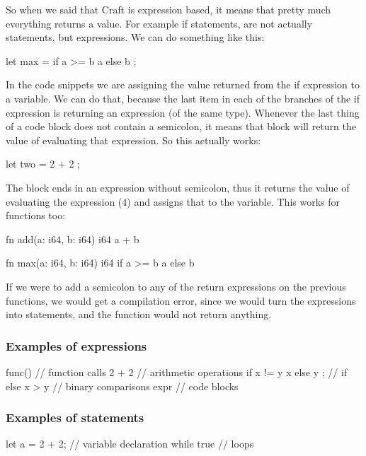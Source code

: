 ﻿\documentclass[10pt,a4paper,twocolumn,twoside]{article}
\begin{document}
So when we said that Craft is expression based, it means that pretty much
everything returns a value. For example if statements, are not actually
statements, but expressions. We can do something like this:

\begin{code}
    let max = if a >= b { a } else { b };
\end{code}

In the code snippets we are assigning the value returned from the if expression
to a variable. We can do that, because the last item in each of the branches of
the if expression is returning an expression (of the same type). Whenever the
last thing of a code block does not contain a semicolon, it means that block
will return the value of evaluating that expression. So this actually works: 

\begin{code}
    let two = {
        2 + 2
    };
\end{code}

The block ends in an expression without semicolon, thus it returns the value of
evaluating the expression (4) and assigns that to the variable. This works for 
functions too:

\begin{code}
    fn add(a: i64, b: i64) i64 {
        a + b
    }

    fn max(a: i64, b: i64) i64 {
        if a >= b { a } else { b }
    }
\end{code}

If we were to add a semicolon to any of the return expressions on the previous
functions, we would get a compilation error, since we would turn the expressions
into statements, and the function would not return anything.

\subsubsection{Examples of expressions}
\begin{code}
func() // function calls
2 + 2 // arithmetic operations
if x != y { x } else { y }; // if else
x > y // binary comparisons
{ expr } // code blocks
\end{code}

\subsubsection{Examples of statements}
\begin{code}
let a = 2 + 2; // variable declaration
while true {  } // loops
\end{code}
\end{document}
